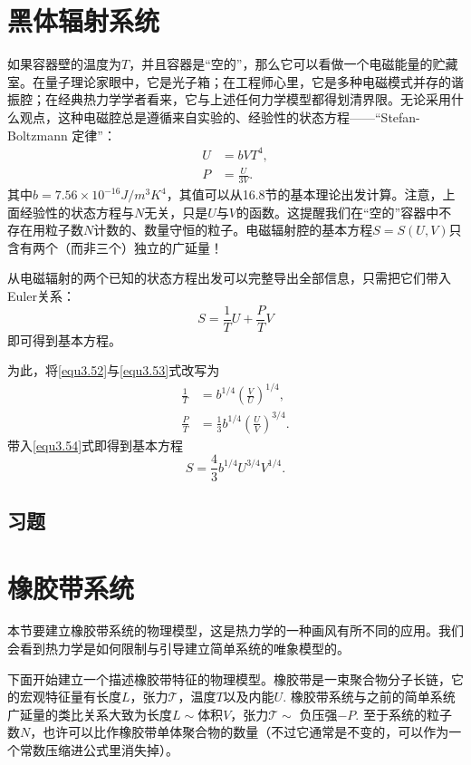 \section{黑体辐射系统}
\label{sec3.6}
如果容器壁的温度为$T$，并且容器是“空的”，那么它可以看做一个电磁能量的贮藏室。在量子理论家眼中，它是光子箱；在工程师心里，它是多种电磁模式并存的谐振腔；在经典热力学学者看来，它与上述任何力学模型都得划清界限。无论采用什么观点，这种电磁腔总是遵循来自实验的、经验性的状态方程——“Stefan-Boltzmann 定律”：
\begin{align}
    U &= bVT^4, \label{equ3.52} \\
    P &= \frac{U}{3V}. \label{equ3.53}
\end{align}
其中$b = 7.56 \times 10^{-16} \si{J / m^3 K^4}$，其值可以从16.8节的基本理论出发计算。注意，上面经验性的状态方程与$N$无关，只是$U$与$V$的函数。这提醒我们在“空的”容器中不存在用粒子数$N$计数的、数量守恒的粒子。电磁辐射腔的基本方程$S = S(U, V)$只含有两个（而非三个）独立的广延量！

从电磁辐射的两个已知的状态方程出发可以完整导出全部信息，只需把它们带入Euler关系：
\begin{equation}
    S = \frac{1}{T} U + \frac{P}{T} V
    \label{equ3.54}
\end{equation}
即可得到基本方程。

为此，将\eqref{equ3.52}与\eqref{equ3.53}式改写为
\begin{align}
    \frac{1}{T} &= b^{1/4} \left( \frac{V}{U} \right)^{1/4}, \label{equ3.55} \\
    \frac{P}{T} &= \frac{1}{3} b^{1/4} \left( \frac{U}{V} \right)^{3/4}. \label{equ3.56}
\end{align}
带入\eqref{equ3.54}式即得到基本方程
\begin{equation}
    S = \frac{4}{3} b^{1/4} U^{3/4} V^{1/4}.
\label{equ3.57}
\end{equation}

\subsection*{习题}


\section{橡胶带系统}
\label{sec3.7}
本节要建立橡胶带系统的物理模型，这是热力学的一种画风有所不同的应用。我们会看到热力学是如何限制与引导建立简单系统的唯象模型的。

下面开始建立一个描述橡胶带特征的物理模型。橡胶带是一束聚合物分子长链，它的宏观特征量有长度$L$，张力$\mathscr{T}$，温度$T$以及内能$U$. 橡胶带系统与之前的简单系统广延量的类比关系大致为长度$L \sim $体积$V$，张力$\mathscr{T} \sim$ 负压强$-P$. 至于系统的粒子数$N$，也许可以比作橡胶带单体聚合物的数量（不过它通常是不变的，可以作为一个常数压缩进公式里消失掉）。

